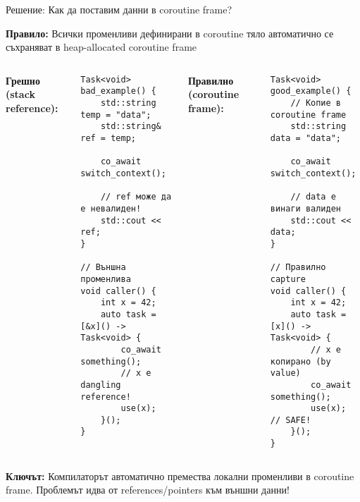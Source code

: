 \documentclass[aspectratio=169]{beamer}
\begin{document}
\begin{frame}[fragile]{Решение: Как да поставим данни в coroutine frame?}

\textbf{Правило:} Всички променливи дефинирани в coroutine тяло автоматично се съхраняват в heap-allocated coroutine frame

\begin{columns}
\textbf{Грешно (stack reference):}
\begin{lstlisting}[basicstyle=\ttfamily\tiny]
Task<void> bad_example() {
    std::string temp = "data";
    std::string& ref = temp;
    
    co_await switch_context();
    
    // ref може да е невалиден!
    std::cout << ref;
}

// Външна променлива
void caller() {
    int x = 42;
    auto task = [&x]() -> Task<void> {
        co_await something();
        // x е dangling reference!
        use(x);
    }();
}
\end{lstlisting}

\textbf{Правилно (coroutine frame):}
\begin{lstlisting}[basicstyle=\ttfamily\tiny]
Task<void> good_example() {
    // Копие в coroutine frame
    std::string data = "data";
    
    co_await switch_context();
    
    // data е винаги валиден
    std::cout << data;
}

// Правилно capture
void caller() {
    int x = 42;
    auto task = [x]() -> Task<void> {
        // x е копирано (by value)
        co_await something();
        use(x); // SAFE!
    }();
}
\end{lstlisting}
\end{columns}

\vspace{0.3cm}
\textbf{Ключът:} Компилаторът автоматично премества локални променливи в coroutine frame. Проблемът идва от references/pointers към външни данни!
\end{frame}
\end{document}
